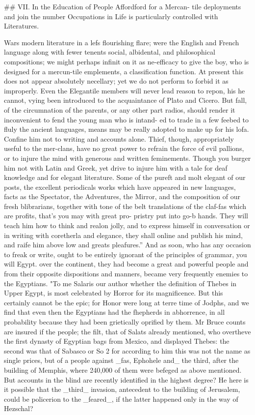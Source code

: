 \documentclass{article}
\begin{document}
\#\# VII. In the Education of People Affordford for a Mercan- tile deployments and join the number Occupations in Life is particularly controlled with Literatures.

Wars modern literature in a lefs flourishing flare; were the English and French language along with fewer tenents social, albidental, and philosophical compositions; we might perhaps infinit on it as ne-efficacy to give the boy, who is designed for a mercun-tile emplements, a classification function. At present this does not appear absolutely necellary; yet we do not perform to forbid it as improperly. Even the Elegantile members will never lead reason to repon, his he cannot, vying been introduced to the acquaintance of Plato and Cicero. But fall, of the circumnation of the parents, or any other part radios, should render it inconvenient to fend the young man who is intand- ed to trade in a few feebed to fluly the ancient languages, means may be really adopted to make up for his lofa. Confine him not to writing and accounts alone. Thief, though, appropriately useful to the mer-clans, have no great power to refrain the force of evil pallions, or to injure the mind with generous and written feminements. Though you burger him not with Latin and Greek, yet drive to injure him with a tale for deaf knowledge and for elegant literature. Some of the pureft and molt elegant of our posts, the excellent periodicals works which have appeared in new languages, facts as the Spectator, the Adventures, the Mirror, and the composition of our fresh blibrarians, together with tone of the belt translations of the claf-fas which are profits, that’s you may with great pro- pristry put into go-b hands. They will teach him how to think and realon jolly, and to express himself in conversation or in writing with coretherla and elegance, they shall online and publish his mind, and raife him above low and greats pleafures.” And as soon, who has any occasion to freak or write, ought to be entirely ignorant of the principles of grammar, you will Egypt. over the continent, they had become a great and powerful people and from their opposite dispositions and manners, became very frequently enemies to the Egyptians. "To me Salaris our author whether the definition of Thebes in Upper Egypt, is most celebrated by Horror for its magnificence. But this certainly cannot be the epic; for Honor were long at terre time of Jodphs, and we find that even then the Egyptians had the fhepherds in abhorrence, in all probability because they had been grietically oprified by them. Mr Bruce counts are insured if the people; the filt, that of Salats already mentioned, who overtheve the first dynasty of Egyptian bags from Mexico, and displayed Thebes: the second was that of Sabasco or So 2 for according to him this was not the name as single prices, but of a people against \_fas, Ephohele and\_ the third, after the building of Memphis, where 240,000 of them were befeged as above mentioned. But accounts in the blind are recently identified in the highest degree? He here is it possible that the \_third\_ invasion, antecedent to the building of Jerusalem, could be policerion to the \_feared\_, if the latter happened only in the way of Hezschal?
\end{document}
